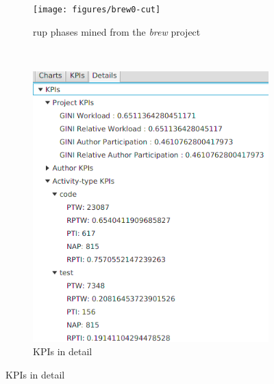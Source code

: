 \begin{figure}[]
\centering
\begin{subfigure}[b]{0.7\textwidth}
    \centering
    \texttt{[image: figures/brew0-cut]}
    \caption{\gls{rup} phases mined from the \textsl{brew} project}
    \label{fig:rup-phases}
\end{subfigure}~
\begin{subfigure}[b]{0.3\textwidth}
    \centering
    \includegraphics[width=\textwidth]{figures/brew3-cut}
    \caption{KPIs in detail}
    \label{fig:brew3}
\end{subfigure}


\end{figure}
